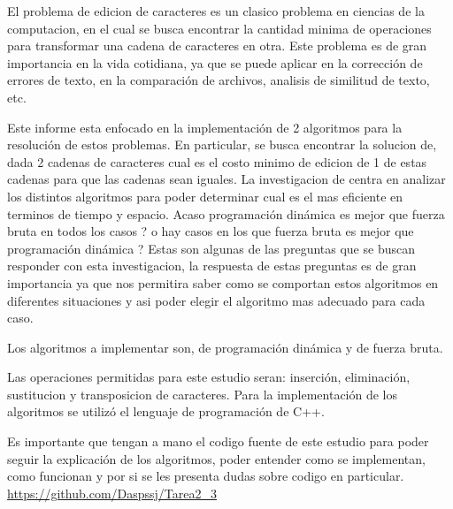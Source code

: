 El problema de edicion de caracteres es un clasico problema en ciencias de la computacion, en el cual se busca encontrar 
la cantidad minima de operaciones para transformar una cadena de caracteres en otra. Este problema es de gran importancia en la vida cotidiana,
ya que se puede aplicar en la corrección de errores de texto, en la comparación de archivos, analisis de similitud de texto, etc.


Este informe esta enfocado en la implementación de 2 algoritmos para la resolución de estos problemas. En particular, 
se busca encontrar la solucion de, dada 2 cadenas de caracteres cual es el costo minimo de edicion de 1 de estas cadenas para que las cadenas sean iguales.
La investigacion de centra en analizar los distintos algoritmos para poder determinar cual es el mas eficiente en terminos de tiempo y espacio. Acaso
programación dinámica es mejor que fuerza bruta en todos los casos ? o hay casos en los que fuerza bruta es mejor que programación dinámica ?
Estas son algunas de las preguntas que se buscan responder con esta investigacion, la respuesta de estas preguntas es de gran importancia ya que
nos permitira saber como se comportan estos algoritmos en diferentes situaciones y asi poder elegir el algoritmo mas adecuado para cada caso.


Los algoritmos a implementar son, de programación dinámica y de fuerza bruta.


Las operaciones permitidas para este estudio seran: inserción, eliminación, sustitucion y transposicion de caracteres. Para la implementación 
de los algoritmos se utilizó el lenguaje de programación de C++.


Es importante que tengan a mano el codigo fuente de este estudio para poder seguir la explicación de los algoritmos, poder entender
como se implementan, como funcionan y por si se les presenta dudas sobre codigo en particular.
\url{https://github.com/Daspssj/Tarea2_3}
